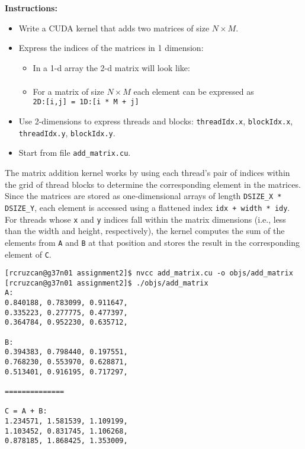 \documentclass{article}
\newcounter{exercise}
\newenvironment{exr}[1]{%
    \refstepcounter{exercise}
    \begin{tcolorbox}[colback=blue!5!white, colframe=blue!75!black, title=Exercise \theexercise]
    \textbf{Instructions:} #1
    \end{tcolorbox}
    \vspace{1em}
}{}
\begin{document}
\begin{exr}{
    \begin{itemize}
      \item Write a CUDA kernel that adds two matrices of size $N\times M$.
      \item Express the indices of the matrices in 1 dimension:
        \begin{itemize}
          \item In a 1-d array the 2-d matrix will look like:
            \begin{align*}
            [A_{11},\, A_{12},\, A_{13},\, \dots,\, A_{1M}, A_{21},\, A_{22},\, \dots,\, A_{2M}, \dots, A_{N1},\, A_{N2},\, \dots,\, A_{NM}]
            \end{align*}
          \item For a matrix of size $N\times M$ each element can be expressed as \\
            \texttt{2D:[i,j] = 1D:[i * M + j]}
        \end{itemize}
      \item Use 2-dimensions to express threads and blocks: \texttt{threadIdx.x}, \texttt{blockIdx.x}, \texttt{threadIdx.y}, \texttt{blockIdx.y}.
      \item Start from file \texttt{add\_matrix.cu}.
    \end{itemize}   
}\end{exr}

The matrix addition kernel works by using each thread’s pair of indices within the grid of thread blocks to determine the corresponding element in the matrices. Since the matrices are stored as one-dimensional arrays of length \texttt{DSIZE\_X * DSIZE\_Y}, each element is accessed using a flattened index \texttt{idx + width * idy}. For threads whose \texttt{x} and \texttt{y} indices fall within the matrix dimensions (i.e., less than the width and height, respectively), the kernel computes the sum of the elements from \texttt{A} and \texttt{B} at that position and stores the result in the corresponding element of \texttt{C}.



\begin{lstlisting}[style=output]
[rcruzcan@g37n01 assignment2]$ nvcc add_matrix.cu -o objs/add_matrix
[rcruzcan@g37n01 assignment2]$ ./objs/add_matrix
A:
0.840188, 0.783099, 0.911647, 
0.335223, 0.277775, 0.477397, 
0.364784, 0.952230, 0.635712, 

B:
0.394383, 0.798440, 0.197551, 
0.768230, 0.553970, 0.628871, 
0.513401, 0.916195, 0.717297, 

==============

C = A + B:
1.234571, 1.581539, 1.109199, 
1.103452, 0.831745, 1.106268, 
0.878185, 1.868425, 1.353009, 
\end{lstlisting}
\end{document}
